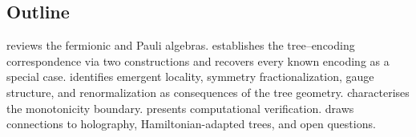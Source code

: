 \subsection*{Outline}

 reviews the fermionic and Pauli algebras.
 establishes the tree--encoding correspondence
via two constructions and recovers every known encoding as a special
case.
 identifies emergent locality, symmetry
fractionalization, gauge structure, and renormalization as consequences
of the tree geometry.
 characterises the monotonicity boundary.
 presents computational verification.
 draws connections to holography, Hamiltonian-adapted
trees, and open questions.
